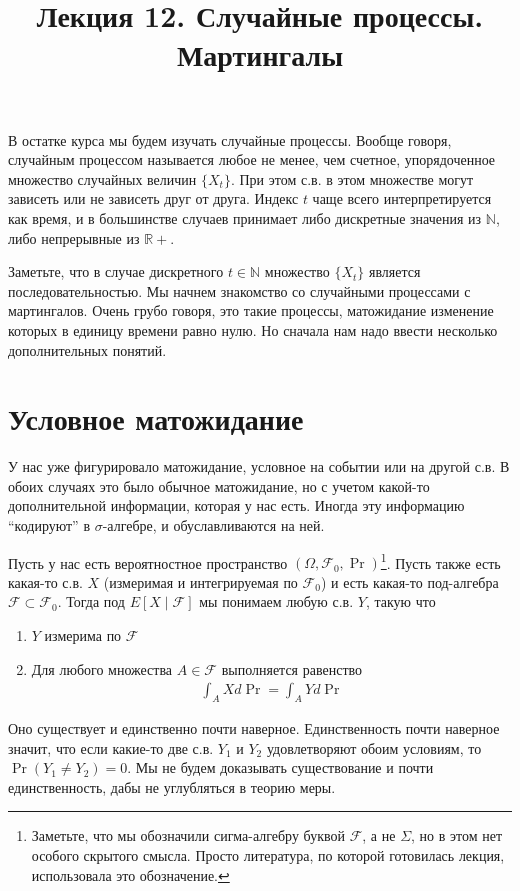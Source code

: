 \documentclass[12pt]{article}
\title{Лекция 12. Случайные процессы. Мартингалы}
\newcommand\N{\mathbb{N}}
\newcommand\R{\mathbb{R}}
\newcommand\F{\mathcal{F}}
\begin{document}
\maketitle

В остатке курса мы будем изучать случайные процессы. Вообще говоря, случайным процессом называется любое не менее, чем счетное, упорядоченное множество случайных величин $\{X_t\}$. При этом с.в. в этом множестве могут зависеть или не зависеть друг от друга. Индекс $t$ чаще всего интерпретируется как время, и в большинстве случаев принимает либо дискретные значения из $\N$, либо непрерывные из $\R+$. 

Заметьте, что в случае дискретного $t \in \N$ множество $\{X_t\}$ является последовательностью. Мы начнем знакомство со случайными процессами с мартингалов. Очень грубо говоря, это такие процессы, матожидание изменение которых в единицу времени равно нулю. Но сначала нам надо ввести несколько дополнительных понятий.

\section{Условное матожидание}

У нас уже фигурировало матожидание, условное на событии или на другой с.в. В обоих случаях это было обычное матожидание, но с учетом какой-то дополнительной информации, которая у нас есть. Иногда эту информацию ``кодируют'' в $\sigma$-алгебре, и обуславливаются на ней.

Пусть у нас есть вероятностное пространство $(\Omega, \F_0, \Pr)$\footnote{Заметьте, что мы обозначили сигма-алгебру буквой $\F$, а не $\Sigma$, но в этом нет особого скрытого смысла. Просто литература, по которой готовилась лекция, использовала это обозначение.}. Пусть также есть какая-то с.в. $X$ (измеримая и интегрируемая по $\F_0$) и есть какая-то под-алгебра $\F \subset \F_0$. Тогда под $E[X \mid \F]$ мы понимаем любую с.в. $Y$, такую что 

\begin{enumerate}
  \item $Y$ измерима по $\F$
  \item Для любого множества $A \in \F$ выполняется равенство
  \begin{align*}
    \int_A X d\Pr = \int_A Y d\Pr
  \end{align*}
\end{enumerate}

Оно существует и единственно почти наверное. Единственность почти наверное значит, что если какие-то две с.в. $Y_1$ и $Y_2$ удовлетворяют обоим условиям, то $\Pr(Y_1 \ne Y_2) = 0$. Мы не будем доказывать существование и почти единственность, дабы не углубляться в теорию меры.
\end{document}
